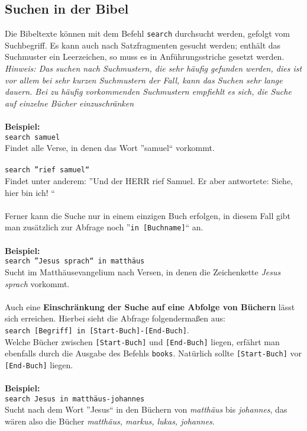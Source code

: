 \documentclass[a4paper]{scrartcl}
\begin{document}
\subsection{Suchen in der Bibel}

Die Bibeltexte können mit dem Befehl \texttt{search} durchsucht werden, gefolgt vom Suchbegriff. Es kann auch nach Satzfragmenten gesucht werden; enthält das Suchmuster ein Leerzeichen, so muss es in Anführungsstriche gesetzt werden.\\

\textit{Hinweis: Das suchen nach Suchmustern, die sehr häufig gefunden werden, dies ist vor allem bei sehr kurzen Suchmustern der Fall, kann das Suchen sehr lange dauern. Bei zu häufig vorkommenden Suchmustern empfiehlt es sich, die Suche auf einzelne Bücher einzuschränken}\\
\\
\textbf{Beispiel:}
\\
\texttt{search samuel}\\
Findet alle Verse, in denen das Wort ''samuel`` vorkommt.\\
\\
\texttt{search ''rief samuel`` }\\
Findet unter anderem: ''Und der HERR rief Samuel. Er aber antwortete: Siehe, hier bin ich! ``\\
\\
Ferner kann die Suche nur in einem einzigen Buch erfolgen, in diesem Fall gibt man zusätzlich zur Abfrage noch ''\texttt{in [Buchname]}`` an.\\
\\
\textbf{Beispiel:}\\
\texttt{search ''Jesus sprach`` in matthäus}\\
Sucht im Matthäusevangelium nach Versen, in denen die Zeichenkette \textit{Jesus sprach} vorkommt.\\
\\
Auch eine \textbf{Einschränkung der Suche auf eine Abfolge von Büchern} lässt sich erreichen. Hierbei sieht die Abfrage folgendermaßen aus:\\
\texttt{search [Begriff] in [Start-Buch]-[End-Buch]}.\\
Welche Bücher zwischen \texttt{[Start-Buch]} und \texttt{[End-Buch]} liegen, erfährt man ebenfalls durch die Ausgabe des Befehls \texttt{books}. Natürlich sollte \texttt{[Start-Buch]} vor \texttt{[End-Buch]} liegen.\\
\\
\textbf{Beispiel:}\\
\texttt{search Jesus in matthäus-johannes}\\
Sucht nach dem Wort ''Jesus`` in den Büchern von \textit{matthäus} bis \textit{johannes}, das wären also die Bücher \textit{matthäus, markus, lukas, johannes}.
\end{document}
